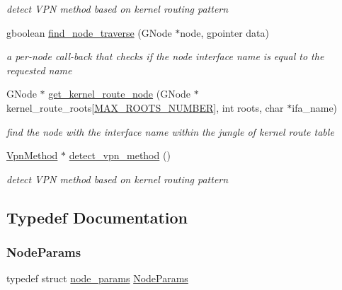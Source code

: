 \begin{DoxyCompactItemize}
\begin{DoxyCompactList}\small\item\em detect V\+PN method based on kernel routing pattern \end{DoxyCompactList}\item 
gboolean \hyperlink{route-tree_8c_a3a0eeaa4d6b227ed8aa19e5d56096cd3}{find\+\_\+node\+\_\+traverse} (G\+Node $\ast$node, gpointer data)
\begin{DoxyCompactList}\small\item\em a per-\/node call-\/back that checks if the node interface name is equal to the requested name \end{DoxyCompactList}\item 
G\+Node $\ast$ \hyperlink{route-tree_8c_a77affcaa875961893c05c7e211678ed1}{get\+\_\+kernel\+\_\+route\+\_\+node} (G\+Node $\ast$kernel\+\_\+route\+\_\+roots\mbox{[}\hyperlink{route-tree_8h_a8e1da3af3417de420798c8b448b6a8cb}{M\+A\+X\+\_\+\+R\+O\+O\+T\+S\+\_\+\+N\+U\+M\+B\+ER}\mbox{]}, int roots, char $\ast$ifa\+\_\+name)
\begin{DoxyCompactList}\small\item\em find the node with the interface name within the jungle of kernel route table \end{DoxyCompactList}\item 
\hyperlink{route-tree_8h_a1034dd038389279bf422489d4d99d43a}{Vpn\+Method} $\ast$ \hyperlink{route-tree_8c_a267529614de44218b8187f3ac46ce46f}{detect\+\_\+vpn\+\_\+method} ()
\begin{DoxyCompactList}\small\item\em detect V\+PN method based on kernel routing pattern \end{DoxyCompactList}\end{DoxyCompactItemize}


\subsection{Typedef Documentation}
\mbox{\label{route-tree_8c_a3aa763b62cd1d285ed35bb7f0fe4d149}} 
\subsubsection{\texorpdfstring{Node\+Params}{NodeParams}}
{\footnotesize\ttfamily typedef struct \hyperlink{structnode__params}{node\+\_\+params}  \hyperlink{route-tree_8c_a3aa763b62cd1d285ed35bb7f0fe4d149}{Node\+Params}}




